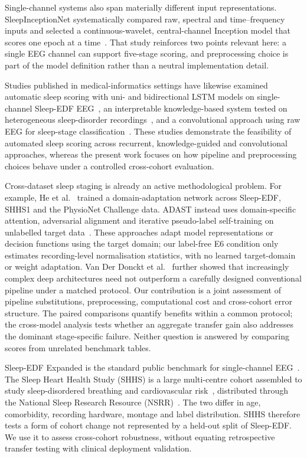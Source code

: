 \documentclass[11pt,a4paper]{article}
\begin{document}
Single-channel systems also span materially different input representations. SleepInceptionNet
systematically compared raw, spectral and time--frequency inputs and selected a continuous-wavelet,
central-channel Inception model that scores one epoch at a time~\cite{haghayegh2023sleepinceptionnet}.
That study reinforces two points relevant here: a single EEG channel can support five-stage scoring, and
preprocessing choice is part of the model definition rather than a neutral implementation detail.

Studies published in medical-informatics settings have likewise examined automatic sleep scoring with
uni- and bidirectional LSTM models on single-channel Sleep-EDF EEG~\cite{fraiwan2020lstm}, an
interpretable knowledge-based system tested on heterogeneous sleep-disorder recordings~\cite{vanbuis2020userfriendly},
and a convolutional approach using raw EEG for sleep-stage classification~\cite{sundar2021cnn}.
These studies demonstrate the feasibility of automated sleep scoring across recurrent, knowledge-guided
and convolutional approaches, whereas the present work focuses on how pipeline and preprocessing choices
behave under a controlled cross-cohort evaluation.

Cross-dataset sleep staging is already an active methodological problem. For example, He et
al.~\cite{he2023crossscenario} trained a domain-adaptation network across Sleep-EDF, SHHS1 and the
PhysioNet Challenge data. ADAST instead uses domain-specific attention, adversarial alignment and
iterative pseudo-label self-training on unlabelled target data~\cite{eldele2023adast}. These approaches
adapt model representations or decision functions using the target domain; our label-free E6 condition
only estimates recording-level normalisation statistics, with no learned target-domain or weight adaptation.
Van Der Donckt et al.~\cite{vdd2023traditional} further showed that increasingly complex deep
architectures need not outperform a carefully designed conventional pipeline under a matched protocol.
Our contribution is a joint assessment of pipeline substitutions, preprocessing, computational cost
and cross-cohort error structure. The paired comparisons quantify benefits within a common protocol;
the cross-model analysis tests whether an aggregate transfer gain also addresses the dominant stage-specific
failure. Neither question is answered by comparing scores from unrelated benchmark tables.

Sleep-EDF Expanded is the standard public benchmark for single-channel
EEG~\cite{kemp2000sleepEDF,physionetSleepEDF}. The Sleep Heart Health Study (SHHS) is a large
multi-centre cohort assembled to study sleep-disordered breathing and cardiovascular
risk~\cite{quan1997shhs}, distributed through the National Sleep Research Resource
(NSRR)~\cite{zhang2018nsrr}. The two differ in age, comorbidity, recording hardware, montage and label
distribution. SHHS therefore tests a form of cohort change not represented by a held-out split of
Sleep-EDF. We use it to assess cross-cohort robustness, without equating retrospective transfer testing
with clinical deployment validation.
\end{document}

